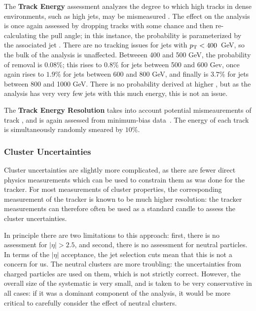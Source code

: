 	The \textbf{Track Energy} assessment analyzes the degree to which high \pt tracks in dense environments, such as high \pt jets, may be mismeasured . The effect on the analysis is once again assessed by dropping tracks with some chance and then re-calculating the pull angle; in this instance, the probability is parameterized by the associated jet \pt. There are no tracking issues for jets with $p_{\text{T}} < 400$~GeV, so the bulk of the analysis is unaffected. Betweeen 400 and 500 GeV, the probability of removal is $0.08\%$; this rises to $0.8\%$ for jets between 500 and 600 Gev, once again rises to $1.9\%$ for jets between 600 and 800 GeV, and finally is $3.7\%$ for jets between 800 and 1000 GeV. There is no probability derived at higher \pt, but as the analysis has very very few jets with this much energy, this is not an issue.

	The \textbf{Track Energy Resolution} takes into account potential mismeaurements of track \pt, and is again assessed from minimum-bias data~. The energy of each track is simultaneously randomly smeared by $10\%$. 

	\subsubsection{Cluster Uncertainties}

	Cluster uncertainties are slightly more complicated, as there are fewer direct physics measurements which can be used to constrain them as was done for the tracker. For most measurements of cluster properties, the corresponding measurement of the tracker is known to be much higher resolution: the tracker measurements can therefore often be used as a standard candle to assess the cluster uncertainties.

	In principle there are two limitations to this approach: first, there is no assessment for $|\eta| > 2.5$, and second, there is no assessment for neutral particles. In terms of the $|\eta|$ acceptance, the jet selection cuts mean that this is not a concern for us. The neutral clusters are more troubling: the uncertainties from charged particles are used on them, which is not strictly correct. However, the overall size of the systematic is very small, and is taken to be very conservative in all cases: if it was a dominant component of the analysis, it would be more critical to carefully consider the effect of neutral clusters.

